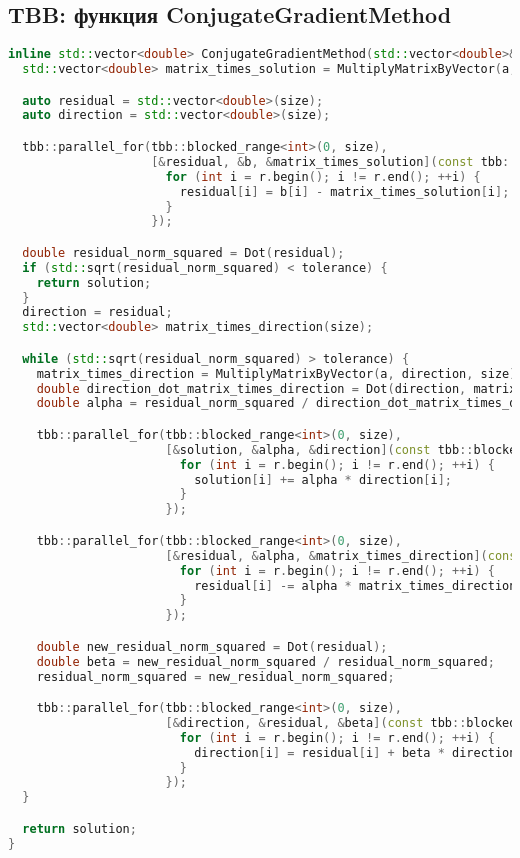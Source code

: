 \documentclass[12pt]{article}
\begin{document}
\subsection*{TBB: функция ConjugateGradientMethod}
\begin{lstlisting}[language=C++]
inline std::vector<double> ConjugateGradientMethod(std::vector<double>& a, std::vector<double>& b, std::vector<double> solution, double tolerance, int size) {
  std::vector<double> matrix_times_solution = MultiplyMatrixByVector(a, solution, size);

  auto residual = std::vector<double>(size);
  auto direction = std::vector<double>(size);

  tbb::parallel_for(tbb::blocked_range<int>(0, size),
                    [&residual, &b, &matrix_times_solution](const tbb::blocked_range<int>& r) {
                      for (int i = r.begin(); i != r.end(); ++i) {
                        residual[i] = b[i] - matrix_times_solution[i];
                      }
                    });

  double residual_norm_squared = Dot(residual);
  if (std::sqrt(residual_norm_squared) < tolerance) {
    return solution;
  }
  direction = residual;
  std::vector<double> matrix_times_direction(size);

  while (std::sqrt(residual_norm_squared) > tolerance) {
    matrix_times_direction = MultiplyMatrixByVector(a, direction, size);
    double direction_dot_matrix_times_direction = Dot(direction, matrix_times_direction);
    double alpha = residual_norm_squared / direction_dot_matrix_times_direction;

    tbb::parallel_for(tbb::blocked_range<int>(0, size),
                      [&solution, &alpha, &direction](const tbb::blocked_range<int>& r) {
                        for (int i = r.begin(); i != r.end(); ++i) {
                          solution[i] += alpha * direction[i];
                        }
                      });

    tbb::parallel_for(tbb::blocked_range<int>(0, size),
                      [&residual, &alpha, &matrix_times_direction](const tbb::blocked_range<int>& r) {
                        for (int i = r.begin(); i != r.end(); ++i) {
                          residual[i] -= alpha * matrix_times_direction[i];
                        }
                      });

    double new_residual_norm_squared = Dot(residual);
    double beta = new_residual_norm_squared / residual_norm_squared;
    residual_norm_squared = new_residual_norm_squared;

    tbb::parallel_for(tbb::blocked_range<int>(0, size),
                      [&direction, &residual, &beta](const tbb::blocked_range<int>& r) {
                        for (int i = r.begin(); i != r.end(); ++i) {
                          direction[i] = residual[i] + beta * direction[i];
                        }
                      });
  }

  return solution;
}
\end{lstlisting}
\end{document}
